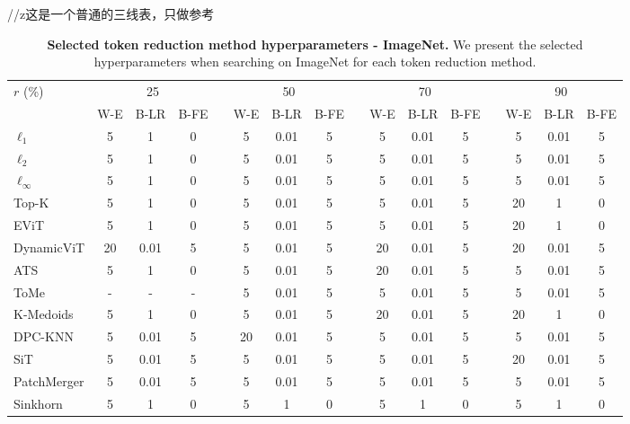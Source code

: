 \documentclass{ctexart}
\begin{document}
//z这是一个普通的三线表，只做参考
\begin{table*}[!htp]
    \caption{\textbf{Selected token reduction method hyperparameters - ImageNet.} We present the selected hyperparameters when searching on ImageNet for each token reduction method.}
    \label{tab:imagenetHyper}
    \centering
    \begin{tabular}{@{}lccclccclccclccc@{}}
    \toprule
     $r$ (\%) & \multicolumn{3}{c}{25} &  & \multicolumn{3}{c}{50} &  & \multicolumn{3}{c}{70} &  & \multicolumn{3}{c}{90} \\\cmidrule(lr){2-4} \cmidrule(lr){6-8} \cmidrule(lr){10-12} \cmidrule(lr){14-16}
     & W-E & B-LR & B-FE & & W-E & B-LR & B-FE & & W-E & B-LR & B-FE & & W-E & B-LR & B-FE \\ \midrule
    $\ell_1$ & 5 & 1 & 0 & & 5 & 0.01 & 5 & & 5 & 0.01 & 5 & & 5 & 0.01 & 5 \\
    $\ell_2$ & 5 & 1 & 0 & & 5 & 0.01 & 5 & & 5 & 0.01 & 5 & & 5 & 0.01 & 5 \\
    $\ell_\infty$ & 5 & 1 & 0 & & 5 & 0.01 & 5 & & 5 & 0.01 & 5 & & 5 & 0.01 & 5 \\ \midrule
    Top-K & 5 & 1 & 0 & & 5 & 0.01 & 5 & & 5 & 0.01 & 5 & & 20 & 1 & 0 \\
    EViT & 5 & 1 & 0 & & 5 & 0.01 & 5 & & 5 & 0.01 & 5 & & 20 & 1 & 0 \\
    DynamicViT & 20 & 0.01 & 5 & & 5 & 0.01 & 5 & & 20 & 0.01 & 5 & & 20 & 0.01 & 5 \\
    ATS & 5 & 1 & 0 & & 5 & 0.01 & 5 & & 20 & 0.01 & 5 & & 5 & 0.01 & 5 \\ \midrule
    ToMe & - & - & - & & 5 & 0.01 & 5 & & 5 & 0.01 & 5 & & 5 & 0.01 & 5 \\
    K-Medoids & 5 & 1 & 0 & & 5 & 0.01 & 5 & & 20 & 0.01 & 5 & & 20 & 1 & 0 \\
    DPC-KNN & 5 & 0.01 & 5 & & 20 & 0.01 & 5 & & 5 & 0.01 & 5 & & 5 & 0.01 & 5 \\ \midrule
    SiT & 5 & 0.01 & 5 & & 5 & 0.01 & 5 & & 5 & 0.01 & 5 & & 20 & 0.01 & 5 \\
    PatchMerger & 5 & 0.01 & 5 & & 5 & 0.01 & 5 & & 5 & 0.01 & 5 & & 5 & 0.01 & 5 \\
    Sinkhorn & 5 & 1 & 0 & & 5 & 1 & 0 & & 5 & 1 & 0 & & 5 & 1 & 0 \\ \bottomrule
    \end{tabular}
\end{table*}
\end{document}
